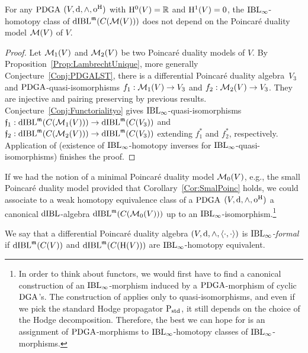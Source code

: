 \documentclass[\MainFolder/Text.tex]{subfiles}
\begin{document}
\begin{Conjecture}\label{Conj:ExteofDFS}
For any $\mathrm{PDGA}$ $(V,\mathrm{d},\wedge,\mathrm{o}^{\mathrm{H}})$ with $\mathrm{H}^0(V)=\mathbb{R}$ and $\mathrm{H}^1(V)=0$, the $\mathrm{IBL}_\infty$-homotopy class of $\mathrm{dIBL}^{\mathfrak{m}}(C(\mathcal{M}(V)))$ does not depend on the Poincar\'e duality model $\mathcal{M}(V)$ of $V$.
\end{Conjecture}
\begin{proof}
Let $\mathcal{M}_1(V)$ and $\mathcal{M}_2(V)$ be two Poincar\'e duality models of $V$. By Proposition~\ref{Prop:LambrechtUnique}, more generally Conjecture~\ref{Conj:PDGALST}, there is a differential Poincar\'e duality algebra~$V_3$ and $\mathrm{PDGA}$-quasi-isomorphisms $f_1: \mathcal{M}_1(V)\rightarrow V_3$ and $f_2: \mathcal{M}_2(V)\rightarrow V_3$. They are injective and pairing preserving by previous results. Conjecture~\ref{Conj:Functorialityo} gives $\mathrm{IBL}_\infty$-quasi-isomorphisms $\mathfrak{f}_1: \mathrm{dIBL}^{\mathfrak{m}}(C(\mathcal{M}_1(V))) \rightarrow \mathrm{dIBL}^{\mathfrak{m}}(C(V_3))$ and $\mathfrak{f}_2: \mathrm{dIBL}^{\mathfrak{m}}(C(\mathcal{M}_2(V))) \rightarrow \mathrm{dIBL}^{\mathfrak{m}}(C(V_3))$ extending $f_1^*$ and $f_2^*$, respectively. Application of \cite[Theorem 1.2]{Cieliebak2015} (existence of $\mathrm{IBL}_\infty$-homotopy inverses for $\mathrm{IBL}_\infty$-quasi-isomorphisms) finishes the proof.
\end{proof}

If we had the notion of a minimal Poincar\'e duality model $\mathcal{M}_0(V)$, e.g., the small Poincar\'e duality model provided that Corollary~\ref{Cor:SmalPoinc} holds, we could associate to a weak homotopy equivalence class of a $\mathrm{PDGA}$ $(V,\mathrm{d},\wedge,\mathrm{o}^{\mathrm{H}})$ a canonical $\mathrm{dIBL}$-algebra $\mathrm{dIBL}^{\mathfrak{m}}(C(\mathcal{M}_0(V)))$ up to an $\mathrm{IBL}_\infty$-isomorphism.\footnote{In order to think about functors, we would first have to find a canonical construction of an $\mathrm{IBL}_\infty$-morphism induced by a $\mathrm{PDGA}$-morphism of cyclic $\mathrm{DGA}$'s. The construction of \cite[Section~11]{Cieliebak2015} applies only to quasi-isomorphisms, and even if we pick the standard Hodge propagator $\mathrm{P}_{\mathrm{std}}$, it still depends on the choice of the Hodge decomposition. Therefore, the best we can hope for is an assignment of $\mathrm{PDGA}$-morphisms to $\mathrm{IBL}_\infty$-homotopy classes of $\mathrm{IBL}_\infty$-morphisms.}

\begin{Definition}\label{Def:IBLFormality}
We say that a differential Poincar\'e duality algebra $(V,\mathrm{d},\wedge,\langle\cdot,\cdot\rangle)$ is \emph{$\mathrm{IBL}_\infty$-formal} if $\mathrm{dIBL}^{\mathfrak{m}}(C(V))$ and $\mathrm{dIBL}^{\mathfrak{m}}(C(\mathrm{H}(V)))$ are $\mathrm{IBL}_\infty$-homotopy equivalent.
\end{Definition}
\end{document}
